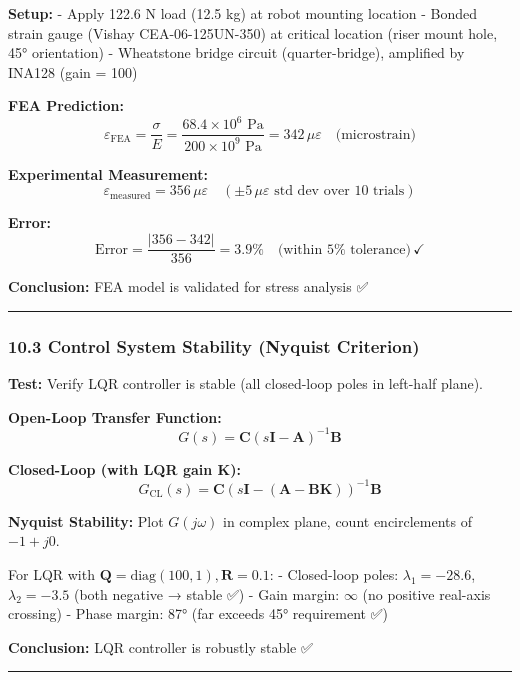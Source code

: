 \documentclass[
]{article}
\begin{document}
\textbf{Setup:} - Apply 122.6 N load (12.5 kg) at robot mounting
location - Bonded strain gauge (Vishay CEA-06-125UN-350) at critical
location (riser mount hole, 45° orientation) - Wheatstone bridge circuit
(quarter-bridge), amplified by INA128 (gain = 100)

\textbf{FEA Prediction:} \[
\varepsilon_{\text{FEA}} = \frac{\sigma}{E} = \frac{68.4 \times 10^6 \text{ Pa}}{200 \times 10^9 \text{ Pa}} = 342 \, \mu\varepsilon \quad \text{(microstrain)}
\]

\textbf{Experimental Measurement:} \[
\varepsilon_{\text{measured}} = 356 \, \mu\varepsilon \quad (\pm 5 \, \mu\varepsilon \text{ std dev over 10 trials})
\]

\textbf{Error:} \[
\text{Error} = \frac{|356 - 342|}{356} = 3.9\% \quad \text{(within 5%
\]

\textbf{Conclusion:} FEA model is validated for stress analysis ✅

\begin{center}\rule{0.5\linewidth}{0.5pt}\end{center}

\hypertarget{control-system-stability-nyquist-criterion}{%
\subsubsection{10.3 Control System Stability (Nyquist
Criterion)}\label{control-system-stability-nyquist-criterion}}

\textbf{Test:} Verify LQR controller is stable (all closed-loop poles in
left-half plane).

\textbf{Open-Loop Transfer Function:} \[
G(s) = \mathbf{C} (s\mathbf{I} - \mathbf{A})^{-1} \mathbf{B}
\]

\textbf{Closed-Loop (with LQR gain \(\mathbf{K}\)):} \[
G_{\text{CL}}(s) = \mathbf{C} (s\mathbf{I} - (\mathbf{A} - \mathbf{B}\mathbf{K}))^{-1} \mathbf{B}
\]

\textbf{Nyquist Stability:} Plot \(G(j\omega)\) in complex plane, count
encirclements of \(-1 + j0\).

For LQR with \(\mathbf{Q} = \text{diag}(100, 1), \mathbf{R} = 0.1\): -
Closed-loop poles: \(\lambda_1 = -28.6\), \(\lambda_2 = -3.5\) (both
negative → stable ✅) - Gain margin: \(\infty\) (no positive real-axis
crossing) - Phase margin: 87° (far exceeds 45° requirement ✅)

\textbf{Conclusion:} LQR controller is robustly stable ✅

\begin{center}\rule{0.5\linewidth}{0.5pt}\end{center}
\end{document}
